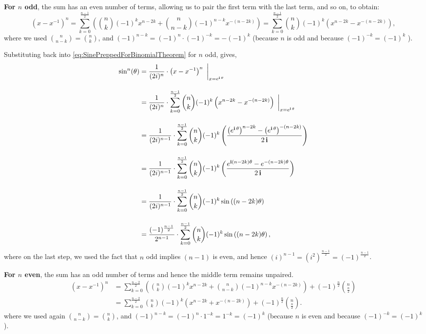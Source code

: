 \textbf{For \( n \) odd}, the sum has an even number of terms, allowing us to pair the first term with the last term, and so on, to obtain:
\begin{equation}
    \left(x - x^{-1} \right)^n = \sum_{k=0}^{\frac{n-1}{2}} \left(\binom{n}{k} (-1)^k  x^{n-2k} + \binom{n}{n-k}(-1)^{n-k}   x^{-(n-2k)}\right) = \sum_{k=0}^{\frac{n-1}{2}} \binom{n}{k} (-1)^k \left( x^{n-2k} - x^{-(n-2k)}\right),
\end{equation}
where we used $ \binom{n}{n-k} = \binom{n}{k}$, and $(-1)^{n-k} = (-1)^n \cdot (-1)^{-k} =-(-1)^k$ (because $n$ is odd and because $(-1)^{-k} = (-1)^{k}$ ).


Substituting back into \eqref{eq:SinePreppedForBinomialTheorem} for $n$ odd, gives,
\begin{align*}
    \sin^n(\theta) &= \frac{1} {(2i)^n} \cdot \left( x - x^{-1}  \right)^n ~\bigg|_{x = e^{\mathop{\bm{\mathrm i}} \theta}} \\[1em] 
    &= \frac{1} {(2i)^n} \cdot \sum_{k=0}^{\frac{n-1}{2}} \binom{n}{k} (-1)^k \left( x^{n-2k} - x^{-(n-2k)}\right) ~\bigg|_{x = e^{\mathop{\bm{\mathrm i}} \theta}} \\[1em]
    &=  \frac{1} {(2i)^{n-1}} \cdot \sum_{k=0}^{\frac{n-1}{2}} \binom{n}{k} (-1)^k \left( \frac{\left(e^{\mathop{\bm{\mathrm i}} \theta}\right)^{n-2k} - \left(e^{\mathop{\bm{\mathrm i}} \theta}\right)^{-(n-2k)}}{2\mathop{\bm{\mathrm i}}} \right)\\[1em]
     &=  \frac{1} {(2i)^{n-1}} \cdot \sum_{k=0}^{\frac{n-1}{2}} \binom{n}{k} (-1)^k \left( \frac{e^{\mathop{\bm{\mathrm i}} (n-2k)\theta}- e^{-(n-2k)\theta}}{2\mathop{\bm{\mathrm i}}} \right)\\[1em]
     &=  \frac{1} {(2i)^{n-1}} \cdot \sum_{k=0}^{\frac{n-1}{2}} \binom{n}{k} (-1)^k \sin\left((n-2k) \theta \right)\\[1em]
    &= \frac{(-1)^{\frac{n-1}{2}}}{2^{n-1}} \cdot \sum_{k=0}^{\frac{n-1}{2}} \binom{n}{k} (-1)^k \sin\left((n-2k) \theta \right),
\end{align*}
where on the last step, we used the fact that $n$ odd implies $(n-1)$ is even, and hence $(i)^{n-1} = (i^2)^{\frac{n-1}{2}} = (-1)^{\frac{n-1}{2}}$.

\textbf{For \( n \) even}, the sum has an odd number of terms and hence the middle term remains unpaired. 
\begin{align*}
    \left(x - x^{-1} \right)^n &= \sum_{k=0}^{\frac{n-2}{2}} \left(\binom{n}{k} (-1)^k  x^{n-2k} + \binom{n}{n-k}(-1)^{n-k}   x^{-(n-2k)}\right) + (-1)^{\frac{n}{2}} \binom{n}{\frac{n}{2}}\\[1em] 
    & = \sum_{k=0}^{\frac{n-2}{2}} \binom{n}{k} (-1)^k \left( x^{n-2k} + x^{-(n-2k)}\right) +  (-1)^{\frac{n}{2}}  \binom{n}{\frac{n}{2}}.
\end{align*}
where we used again $ \binom{n}{n-k} = \binom{n}{k}$, and $(-1)^{n-k} = (-1)^n \cdot 1^{-k}= 1^{-k} =(-1)^k$ (because $n$ is even and because $(-1)^{-k} = (-1)^{k}$ ).

